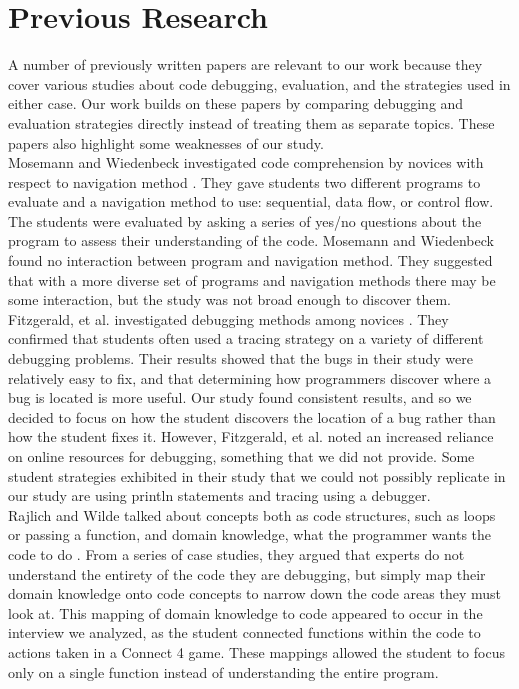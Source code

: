 \section{Previous Research}

A number of previously written papers are relevant to our work because they cover various studies about code debugging, evaluation, and the strategies used in either case. Our work builds on these papers by comparing debugging and evaluation strategies directly instead of treating them as separate topics. These papers also highlight some weaknesses of our study. \\

Mosemann and Wiedenbeck investigated code comprehension by novices with respect to navigation method \cite{mosemann2001}.
They gave students two different programs to evaluate and a navigation method to use: sequential, data flow, or control flow.
The students were evaluated by asking a series of yes/no questions about the program to assess their understanding of the code.
Mosemann and Wiedenbeck found no interaction between program and navigation method.
They suggested that with a more diverse set of programs and navigation methods there may be some interaction, but the study was not broad enough to discover them.\\

Fitzgerald, et al. investigated debugging methods among novices \cite{fitzgerald2008}.
They confirmed that students often used a tracing strategy on a variety of different debugging problems.
Their results showed that the bugs in their study were relatively easy to fix, and that determining how programmers discover where a bug is located is more useful.
Our study found consistent results, and so we decided to focus on how the student discovers the location of a bug rather than how the student fixes it.
However, Fitzgerald, et al. noted an increased reliance on online resources for debugging, something that we did not provide.
Some student strategies exhibited in their study that we could not possibly replicate in our study are using println statements and tracing using a debugger.\\

Rajlich and Wilde talked about concepts both as code structures, such as loops or passing a function, and domain knowledge, what the programmer wants the code to do \cite{1021348}.
From a series of case studies, they argued that experts do not understand the entirety of the code they are debugging, but simply map their domain knowledge onto code concepts to narrow down the code areas they must look at.
This mapping of domain knowledge to code appeared to occur in the interview we analyzed, as the student connected functions within the code to actions taken in a Connect 4 game.
These mappings allowed the student to focus only on a single function instead of understanding the entire program.\\

